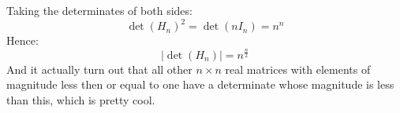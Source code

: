 Taking the determinates of both sides:
\[\det(H_n)^2=\det(nI_n) = n^n\]
Hence:
\[|\det(H_n)|=  n^\frac{n}{2}\]
And it actually turn out that all other $n\times n$ real matrices with elements of magnitude less then or equal to one have a determinate whose magnitude is less than this, which is pretty cool.

%
